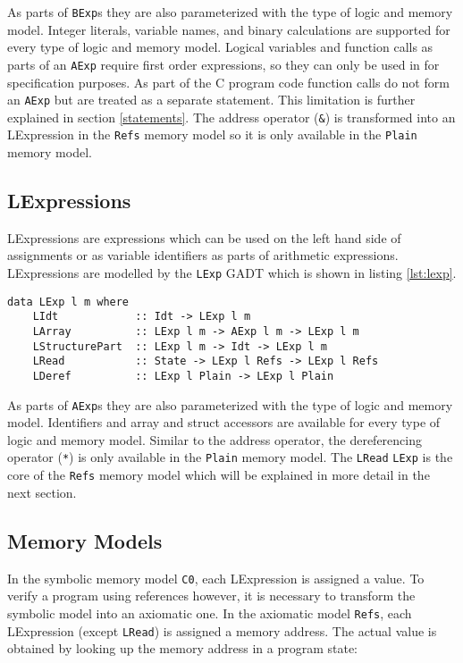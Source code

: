 \documentclass[12pt]{article}
\begin{document}
As parts of \texttt{BExp}s they are also parameterized with the type of logic and memory model.
Integer literals, variable names, and binary calculations are supported for every type of logic and memory model.
Logical variables and function calls as parts of an \texttt{AExp} require first order expressions, so they can only be used in for specification purposes. 
As part of the C program code function calls do not form an \texttt{AExp} but are treated as a separate statement.
This limitation is further explained in section \ref{statements}.
The address operator (\texttt{\&}) is transformed into an LExpression in the \texttt{Refs} memory model so it is only available in the \texttt{Plain} memory model.

\subsection{LExpressions}
LExpressions are expressions which can be used on the left hand side of assignments or as variable identifiers as parts of arithmetic expressions. LExpressions are modelled by the \texttt{LExp} GADT which is shown in listing \ref{lst:lexp}.

\begin{minipage}{\linewidth}
\begin{lstlisting}[style=c0, caption=LExp, label=lst:lexp]
data LExp l m where
    LIdt            :: Idt -> LExp l m
    LArray          :: LExp l m -> AExp l m -> LExp l m
    LStructurePart  :: LExp l m -> Idt -> LExp l m
    LRead           :: State -> LExp l Refs -> LExp l Refs
    LDeref          :: LExp l Plain -> LExp l Plain
\end{lstlisting}
\end{minipage}

As parts of \texttt{AExp}s they are also parameterized with the type of logic and memory model.
Identifiers and array and struct accessors are available for every type of logic and memory model.
Similar to the address operator, the dereferencing operator (\texttt{*}) is only available in the \texttt{Plain} memory model.
The \texttt{LRead} \texttt{LExp} is the core of the \texttt{Refs} memory model which will be explained in more detail in the next section.


\subsection{Memory Models}
\label{memory_models}
In the symbolic memory model \texttt{C0}, each LExpression is assigned a value.
To verify a program using references however, it is necessary to transform the symbolic model into an axiomatic one.
In the axiomatic model \texttt{Refs}, each LExpression (except \texttt{LRead}) is assigned a memory address.
The actual value is obtained by looking up the memory address in a program state:
\end{document}
